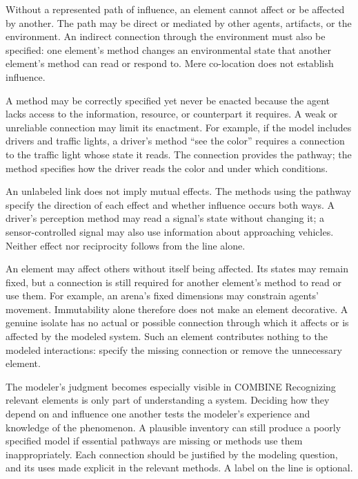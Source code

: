 \documentclass[11pt,a4paper]{article}
\begin{document}
\begin{description}[style=nextline,leftmargin=0pt,itemsep=5pt]
\item[Provide a path for influence.] Without a represented path of influence, an element cannot affect or be affected by another. The path may be direct or mediated by other agents, artifacts, or the environment. An indirect connection through the environment must also be specified: one element's method changes an environmental state that another element's method can read or respond to. Mere co-location does not establish influence.

\item[Connect capabilities to their conditions of use.] A method may be correctly specified yet never be enacted because the agent lacks access to the information, resource, or counterpart it requires. A weak or unreliable connection may limit its enactment. For example, if the model includes drivers and traffic lights, a driver's method ``see the color'' requires a connection to the traffic light whose state it reads. The connection provides the pathway; the method specifies how the driver reads the color and under which conditions.

\item[Distinguish connectivity from the direction of effects.] An unlabeled link does not imply mutual effects. The methods using the pathway specify the direction of each effect and whether influence occurs both ways. A driver's perception method may read a signal's state without changing it; a sensor-controlled signal may also use information about approaching vehicles. Neither effect nor reciprocity follows from the line alone.

\item[Exclude genuine isolates.] An element may affect others without itself being affected. Its states may remain fixed, but a connection is still required for another element's method to read or use them. For example, an arena's fixed dimensions may constrain agents' movement. Immutability alone therefore does not make an element decorative. A genuine isolate has no actual or possible connection through which it affects or is affected by the modeled system. Such an element contributes nothing to the modeled interactions: specify the missing connection or remove the unnecessary element.
\end{description}

\begin{principle}{The modeler's judgment becomes especially visible in COMBINE}
Recognizing relevant elements is only part of understanding a system. Deciding how they depend on and influence one another tests the modeler's experience and knowledge of the phenomenon. A plausible inventory can still produce a poorly specified model if essential pathways are missing or methods use them inappropriately. Each connection should be justified by the modeling question, and its uses made explicit in the relevant methods. A label on the line is optional.
\end{principle}
\end{document}
